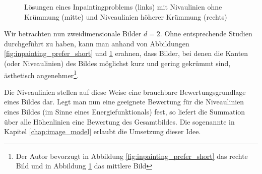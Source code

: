 \documentclass{mythesis}
\begin{document}
\begin{figure}[ht]
    \begin{subfigure}[b]{0.33\textwidth}
	\centering
    \end{subfigure}%
    \begin{subfigure}[b]{0.33\textwidth}
	\centering
    \end{subfigure}%
    \begin{subfigure}[b]{0.33\textwidth}
	\centering
    \end{subfigure}
    \caption{Lösungen eines Inpaintingproblems (links) mit Nivaulinien ohne Krümmung (mitte) und Niveaulinien höherer Krümmung (rechts)}
    \label{fig:inpainting_prefer_non_curved}
\end{figure}

Wir betrachten nun zweidimensionale Bilder $d = 2$.
Ohne entsprechende Studien durchgeführt zu haben, kann man anhand von Abbildungen \ref{fig:inpainting_prefer_short} und \ref{fig:inpainting_prefer_non_curved} erahnen, dass Bilder, bei denen die Kanten (oder Niveaulinien) des Bildes möglichst kurz und gering gekrümmt sind, ästhetisch angenehmer\footnote{Der Autor bevorzugt in Abbildung \ref{fig:inpainting_prefer_short} das rechte Bild und in Abbildung \ref{fig:inpainting_prefer_non_curved} das mittlere Bild}.

Die Niveaulinien stellen auf diese Weise eine brauchbare Bewertungsgrundlage eines Bildes dar.
Legt man nun eine geeignete Bewertung für die Niveaulinien eines Bildes (im Sinne eines Energiefunktionals) fest, so liefert die Summation über alle Höhenlinien eine Bewertung des Gesamtbildes.
Die sogenannte  in Kapitel \ref{chap:image_model} erlaubt die Umsetzung dieser Idee.
\end{document}

